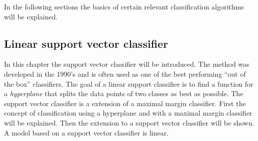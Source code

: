 In the following sections the basics of certain relevant classification algorithms will be explained.

\subsection{Linear support vector classifier}
In this chapter the support vector classifier will be introduced. The method was developed in the 1990’s and is often used as one of the best performing ``out of the box'' classifiers. The goal of a linear support classifier is to find a function for a \emph{hyperplane} that splits the data points of two classes as best as possible. The support vector classifier is a extension of a maximal margin classifier. First  the concept of classification using a hyperplane and with a maximal margin classifier will be explained. Then the extension to a support vector classifier will be shown.
A model based on a support vector classifier is linear.
